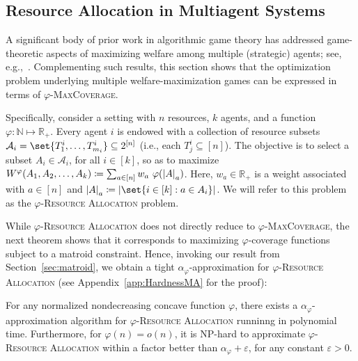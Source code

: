 \subsection{Resource Allocation in Multiagent Systems}
\label{subsection:welfare-maximization}
A significant body of prior work in algorithmic game theory has addressed game-theoretic aspects of maximizing welfare among multiple (strategic) agents; see, e.g.,~\cite{PM19}. Complementing such results, this section shows that the optimization problem underlying multiple welfare-maximization games can be expressed in terms of $\varphi$-\textsc{MaxCoverage}. 

Specifically, consider a setting with $n$ resources, $k$ agents, and a function $\varphi: \mathbb{N} \mapsto \mathbb{R}_+$. Every agent $i$ is endowed with a collection of resource subsets $\mathcal{A}_i = \set{T^i_1, \ldots, T^i_{m_i}}  \subseteq 2^{[n]}$ (i.e., each $T^i_j \subseteq [n]$). The objective is to select a subset $A_i \in \mathcal{A}_i$, for all $i \in [k]$, so as to maximize $W^{\varphi}(A_1, A_2, \ldots, A_k)  \coloneqq \sum_{a \in [n]} w_a \ \varphi(\abs{A}_a)$. Here, $w_a \in \mathbb{R}_+$ is a weight associated with $a \in [n]$ and $\abs{A}_a \coloneqq  \abs{\set{i \in [k] : a \in A_i}}$. We will refer to this problem as the $\varphi$-\textsc{Resource Allocation} problem.

While $\varphi$-\textsc{Resource Allocation} does not directly reduce to $\varphi$-\textsc{MaxCoverage}, the next theorem shows that it corresponds to maximizing $\varphi$-coverage functions subject to a matroid constraint. Hence, invoking our result from Section~\ref{sec:matroid}, we obtain a tight $\alpha_\varphi$-approximation for $\varphi$-\textsc{Resource Allocation} (see Appendix~\ref{app:HardnessMA} for the proof):

\begin{theorem}
For any normalized nondecreasing concave function $\varphi$, there exists a $\alpha_\varphi$-approximation algorithm for $\varphi$-\textsc{Resource Allocation} runninng in polynomial time. Furthermore, for $\varphi(n) = o(n)$, it is \textrm{NP}-hard to approximate $\varphi$-\textsc{Resource Allocation} within a factor better than $\alpha_\varphi + \varepsilon$, for any constant $\varepsilon >0$.
  \label{theo:HardnessMA}
\end{theorem}


